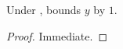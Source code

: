 
\begin{proposition}
\label{prop:foreign}
Under ,  bounds $y$ by
$1$.
\end{proposition}

\begin{proof}
Immediate.
\end{proof}
